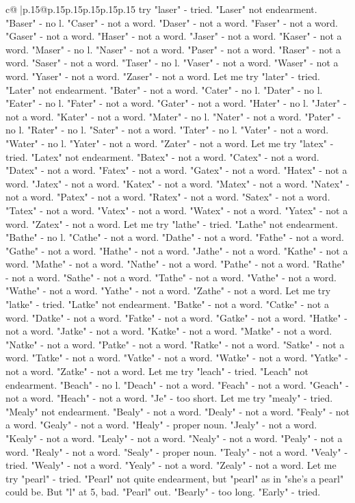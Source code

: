 \documentclass{article}
\begin{document}
{\begin{supertabular}{c@{$\;$}|p{.15\linewidth}@{}p{.15\linewidth}p{.15\linewidth}p{.15\linewidth}p{.15\linewidth}p{.15\linewidth}}
{{{try "laser" {-} tried. "Laser" not endearment. "Baser" {-} no l. "Caser" {-} not a word. "Daser" {-} not a word. "Faser" {-} not a word. "Gaser" {-} not a word. "Haser" {-} not a word. "Jaser" {-} not a word. "Kaser" {-} not a word. "Maser" {-} no l. "Naser" {-} not a word. "Paser" {-} not a word. "Raser" {-} not a word. "Saser" {-} not a word. "Taser" {-} no l. "Vaser" {-} not a word. "Waser" {-} not a word. "Yaser" {-} not a word. "Zaser" {-} not a word. Let me try "later" {-} tried. "Later" not endearment. "Bater" {-} not a word. "Cater" {-} no l. "Dater" {-} no l. "Eater" {-} no l. "Fater" {-} not a word. "Gater" {-} not a word. "Hater" {-} no l. "Jater" {-} not a word. "Kater" {-} not a word. "Mater" {-} no l. "Nater" {-} not a word. "Pater" {-} no l. "Rater" {-} no l. "Sater" {-} not a word. "Tater" {-} no l. "Vater" {-} not a word. "Water" {-} no l. "Yater" {-} not a word. "Zater" {-} not a word. Let me try "latex" {-} tried. "Latex" not endearment. "Batex" {-} not a word. "Catex" {-} not a word. "Datex" {-} not a word. "Fatex" {-} not a word. "Gatex" {-} not a word. "Hatex" {-} not a word. "Jatex" {-} not a word. "Katex" {-} not a word. "Matex" {-} not a word. "Natex" {-} not a word. "Patex" {-} not a word. "Ratex" {-} not a word. "Satex" {-} not a word. "Tatex" {-} not a word. "Vatex" {-} not a word. "Watex" {-} not a word. "Yatex" {-} not a word. "Zatex" {-} not a word. Let me try "lathe" {-} tried. "Lathe" not endearment. "Bathe" {-} no l. "Cathe" {-} not a word. "Dathe" {-} not a word. "Fathe" {-} not a word. "Gathe" {-} not a word. "Hathe" {-} not a word. "Jathe" {-} not a word. "Kathe" {-} not a word. "Mathe" {-} not a word. "Nathe" {-} not a word. "Pathe" {-} not a word. "Rathe" {-} not a word. "Sathe" {-} not a word. "Tathe" {-} not a word. "Vathe" {-} not a word. "Wathe" {-} not a word. "Yathe" {-} not a word. "Zathe" {-} not a word. Let me try "latke" {-} tried. "Latke" not endearment. "Batke" {-} not a word. "Catke" {-} not a word. "Datke" {-} not a word. "Fatke" {-} not a word. "Gatke" {-} not a word. "Hatke" {-} not a word. "Jatke" {-} not a word. "Katke" {-} not a word. "Matke" {-} not a word. "Natke" {-} not a word. "Patke" {-} not a word. "Ratke" {-} not a word. "Satke" {-} not a word. "Tatke" {-} not a word. "Vatke" {-} not a word. "Watke" {-} not a word. "Yatke" {-} not a word. "Zatke" {-} not a word. Let me try "leach" {-} tried. "Leach" not endearment. "Beach" {-} no l. "Deach" {-} not a word. "Feach" {-} not a word. "Geach" {-} not a word. "Heach" {-} not a word. "Je" {-} too short. Let me try "mealy" {-} tried. "Mealy" not endearment. "Bealy" {-} not a word. "Dealy" {-} not a word. "Fealy" {-} not a word. "Gealy" {-} not a word. "Healy" {-} proper noun. "Jealy" {-} not a word. "Kealy" {-} not a word. "Lealy" {-} not a word. "Nealy" {-} not a word. "Pealy" {-} not a word. "Realy" {-} not a word. "Sealy" {-} proper noun. "Tealy" {-} not a word. "Vealy" {-} tried. "Wealy" {-} not a word. "Yealy" {-} not a word. "Zealy" {-} not a word. Let me try "pearl" {-} tried. "Pearl" not quite endearment, but "pearl" as in "she's a pearl" could be. But "l" at 5, bad. "Pearl" out. "Bearly" {-} too long. "Early" {-} tried. }}}
\end{supertabular}}
\end{document}
